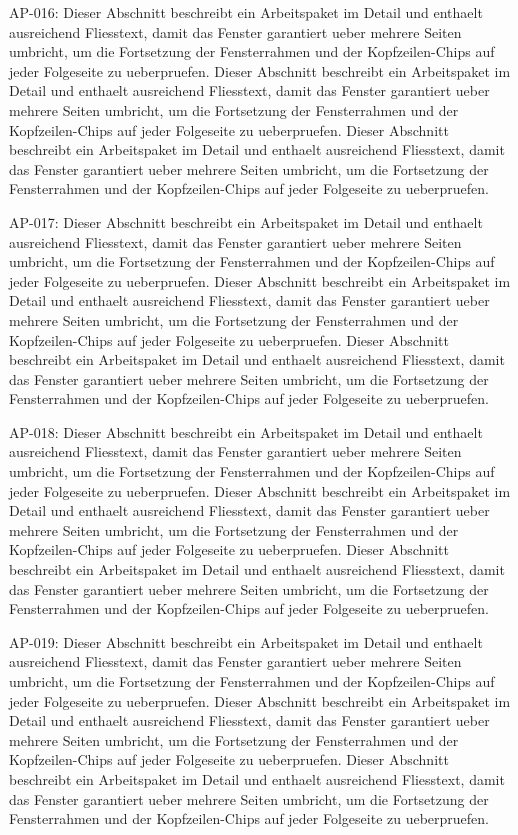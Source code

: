 \documentclass[type=report,theme=dark,language=de]{semio}
\begin{document}
\begin{Table}[title=Lange Tabelle]
AP-016: Dieser Abschnitt beschreibt ein Arbeitspaket im Detail und enthaelt ausreichend Fliesstext, damit das Fenster garantiert ueber mehrere Seiten umbricht, um die Fortsetzung der Fensterrahmen und der Kopfzeilen-Chips auf jeder Folgeseite zu ueberpruefen. Dieser Abschnitt beschreibt ein Arbeitspaket im Detail und enthaelt ausreichend Fliesstext, damit das Fenster garantiert ueber mehrere Seiten umbricht, um die Fortsetzung der Fensterrahmen und der Kopfzeilen-Chips auf jeder Folgeseite zu ueberpruefen. Dieser Abschnitt beschreibt ein Arbeitspaket im Detail und enthaelt ausreichend Fliesstext, damit das Fenster garantiert ueber mehrere Seiten umbricht, um die Fortsetzung der Fensterrahmen und der Kopfzeilen-Chips auf jeder Folgeseite zu ueberpruefen. 

AP-017: Dieser Abschnitt beschreibt ein Arbeitspaket im Detail und enthaelt ausreichend Fliesstext, damit das Fenster garantiert ueber mehrere Seiten umbricht, um die Fortsetzung der Fensterrahmen und der Kopfzeilen-Chips auf jeder Folgeseite zu ueberpruefen. Dieser Abschnitt beschreibt ein Arbeitspaket im Detail und enthaelt ausreichend Fliesstext, damit das Fenster garantiert ueber mehrere Seiten umbricht, um die Fortsetzung der Fensterrahmen und der Kopfzeilen-Chips auf jeder Folgeseite zu ueberpruefen. Dieser Abschnitt beschreibt ein Arbeitspaket im Detail und enthaelt ausreichend Fliesstext, damit das Fenster garantiert ueber mehrere Seiten umbricht, um die Fortsetzung der Fensterrahmen und der Kopfzeilen-Chips auf jeder Folgeseite zu ueberpruefen. 

AP-018: Dieser Abschnitt beschreibt ein Arbeitspaket im Detail und enthaelt ausreichend Fliesstext, damit das Fenster garantiert ueber mehrere Seiten umbricht, um die Fortsetzung der Fensterrahmen und der Kopfzeilen-Chips auf jeder Folgeseite zu ueberpruefen. Dieser Abschnitt beschreibt ein Arbeitspaket im Detail und enthaelt ausreichend Fliesstext, damit das Fenster garantiert ueber mehrere Seiten umbricht, um die Fortsetzung der Fensterrahmen und der Kopfzeilen-Chips auf jeder Folgeseite zu ueberpruefen. Dieser Abschnitt beschreibt ein Arbeitspaket im Detail und enthaelt ausreichend Fliesstext, damit das Fenster garantiert ueber mehrere Seiten umbricht, um die Fortsetzung der Fensterrahmen und der Kopfzeilen-Chips auf jeder Folgeseite zu ueberpruefen. 

AP-019: Dieser Abschnitt beschreibt ein Arbeitspaket im Detail und enthaelt ausreichend Fliesstext, damit das Fenster garantiert ueber mehrere Seiten umbricht, um die Fortsetzung der Fensterrahmen und der Kopfzeilen-Chips auf jeder Folgeseite zu ueberpruefen. Dieser Abschnitt beschreibt ein Arbeitspaket im Detail und enthaelt ausreichend Fliesstext, damit das Fenster garantiert ueber mehrere Seiten umbricht, um die Fortsetzung der Fensterrahmen und der Kopfzeilen-Chips auf jeder Folgeseite zu ueberpruefen. Dieser Abschnitt beschreibt ein Arbeitspaket im Detail und enthaelt ausreichend Fliesstext, damit das Fenster garantiert ueber mehrere Seiten umbricht, um die Fortsetzung der Fensterrahmen und der Kopfzeilen-Chips auf jeder Folgeseite zu ueberpruefen. 


\end{Table}
\end{document}
